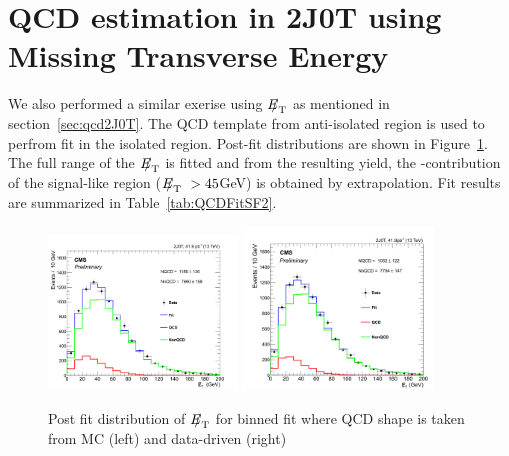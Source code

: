 \section{QCD estimation in 2J0T using Missing Transverse Energy}
\label{app:METFit_2J0T}
We also performed a similar exerise using ${E\!\!\!/}_{\mathrm{T}}$ as mentioned in section~\ref{sec:qcd2J0T}. The QCD template from anti-isolated region is used to perfrom fit in the isolated region. Post-fit distributions are 
shown in Figure~\ref{fig:qcdFit3}. The full range of the ${E\!\!\!/}_{\mathrm{T}}$ is fitted and from the resulting yield, the \QCD-contribution of the signal-like region (${E\!\!\!/}_{\mathrm{T}}~>45$GeV) is obtained by extrapolation. Fit results 
are summarized in Table~\ref{tab:QCDFitSF2}. 
\begin{figure}[hbpt]                                                                                                                                                                            
\begin{center}
\includegraphics[width=0.45\textwidth]{figures/2J0T/Sep3/BinnedFit_MET_QCD_MC.png}
\includegraphics[width=0.45\textwidth]{figures/2J0T/Sep3/BinnedFit_MET_QCD_DD.png}\hfill
\caption{\label{fig:qcdFit3}Post fit distribution of ${E\!\!\!/}_{\mathrm{T}}$ for binned fit where QCD shape is taken from MC (left) and data-driven (right)}
\end{center}
\end{figure}

